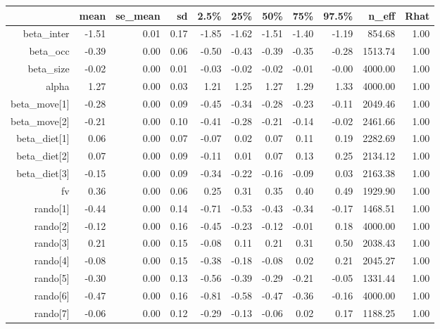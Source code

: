 \begin{table}[ht]
\centering
\begin{tabular}{rrrrrrrrrrr}
  \hline
 & mean & se\_mean & sd & 2.5\% & 25\% & 50\% & 75\% & 97.5\% & n\_eff & Rhat \\ 
  \hline
beta\_inter & -1.51 & 0.01 & 0.17 & -1.85 & -1.62 & -1.51 & -1.40 & -1.19 & 854.68 & 1.00 \\ 
  beta\_occ & -0.39 & 0.00 & 0.06 & -0.50 & -0.43 & -0.39 & -0.35 & -0.28 & 1513.74 & 1.00 \\ 
  beta\_size & -0.02 & 0.00 & 0.01 & -0.03 & -0.02 & -0.02 & -0.01 & -0.00 & 4000.00 & 1.00 \\ 
  alpha & 1.27 & 0.00 & 0.03 & 1.21 & 1.25 & 1.27 & 1.29 & 1.33 & 4000.00 & 1.00 \\ 
  beta\_move[1] & -0.28 & 0.00 & 0.09 & -0.45 & -0.34 & -0.28 & -0.23 & -0.11 & 2049.46 & 1.00 \\ 
  beta\_move[2] & -0.21 & 0.00 & 0.10 & -0.41 & -0.28 & -0.21 & -0.14 & -0.02 & 2461.66 & 1.00 \\ 
  beta\_diet[1] & 0.06 & 0.00 & 0.07 & -0.07 & 0.02 & 0.07 & 0.11 & 0.19 & 2282.69 & 1.00 \\ 
  beta\_diet[2] & 0.07 & 0.00 & 0.09 & -0.11 & 0.01 & 0.07 & 0.13 & 0.25 & 2134.12 & 1.00 \\ 
  beta\_diet[3] & -0.15 & 0.00 & 0.09 & -0.34 & -0.22 & -0.16 & -0.09 & 0.03 & 2163.38 & 1.00 \\ 
  fv & 0.36 & 0.00 & 0.06 & 0.25 & 0.31 & 0.35 & 0.40 & 0.49 & 1929.90 & 1.00 \\ 
  rando[1] & -0.44 & 0.00 & 0.14 & -0.71 & -0.53 & -0.43 & -0.34 & -0.17 & 1468.51 & 1.00 \\ 
  rando[2] & -0.12 & 0.00 & 0.16 & -0.45 & -0.23 & -0.12 & -0.01 & 0.18 & 4000.00 & 1.00 \\ 
  rando[3] & 0.21 & 0.00 & 0.15 & -0.08 & 0.11 & 0.21 & 0.31 & 0.50 & 2038.43 & 1.00 \\ 
  rando[4] & -0.08 & 0.00 & 0.15 & -0.38 & -0.18 & -0.08 & 0.02 & 0.21 & 2045.27 & 1.00 \\ 
  rando[5] & -0.30 & 0.00 & 0.13 & -0.56 & -0.39 & -0.29 & -0.21 & -0.05 & 1331.44 & 1.00 \\ 
  rando[6] & -0.47 & 0.00 & 0.16 & -0.81 & -0.58 & -0.47 & -0.36 & -0.16 & 4000.00 & 1.00 \\ 
  rando[7] & -0.06 & 0.00 & 0.12 & -0.29 & -0.13 & -0.06 & 0.02 & 0.17 & 1188.25 & 1.00 \\ 

\end{tabular}
\end{table}
